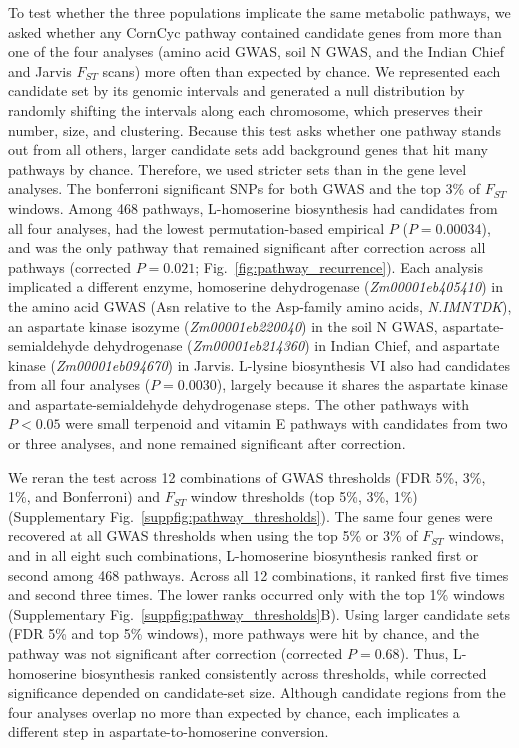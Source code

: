 To test whether the three populations implicate the same metabolic pathways, we asked whether any CornCyc pathway \citep{Hawkins2021PMN} contained candidate genes from more than one of the four analyses (amino acid GWAS, soil N GWAS, and the Indian Chief and Jarvis $F_{ST}$ scans) more often than expected by chance. We represented each candidate set by its genomic intervals and generated a null distribution by randomly shifting the intervals along each chromosome, which preserves their number, size, and clustering. Because this test asks whether one pathway stands out from all others, larger candidate sets add background genes that hit many pathways by chance. Therefore, we used stricter sets than in the gene level analyses. The bonferroni significant SNPs for both GWAS and the top 3\% of $F_{ST}$ windows. Among 468 pathways, L-homoserine biosynthesis had candidates from all four analyses, had the lowest permutation-based empirical $P$ ($P = 0.00034$), and was the only pathway that remained significant after correction across all pathways (corrected $P = 0.021$; Fig.~\ref{fig:pathway_recurrence}). Each analysis implicated a different enzyme, homoserine dehydrogenase (\textit{Zm00001eb405410}) in the amino acid GWAS (Asn relative to the Asp-family amino acids, \textit{N.IMNTDK}), an aspartate kinase isozyme (\textit{Zm00001eb220040}) in the soil N GWAS, aspartate-semialdehyde dehydrogenase (\textit{Zm00001eb214360}) in Indian Chief, and aspartate kinase (\textit{Zm00001eb094670}) in Jarvis. L-lysine biosynthesis VI also had candidates from all four analyses ($P = 0.0030$), largely because it shares the aspartate kinase and aspartate-semialdehyde dehydrogenase steps. The other pathways with $P < 0.05$ were small terpenoid and vitamin E pathways with candidates from two or three analyses, and none remained significant after correction.

We reran the test across 12 combinations of GWAS thresholds (FDR 5\%, 3\%, 1\%, and Bonferroni) and $F_{ST}$ window thresholds (top 5\%, 3\%, 1\%) (Supplementary Fig.~\ref{suppfig:pathway_thresholds}). The same four genes were recovered at all GWAS thresholds when using the top 5\% or 3\% of $F_{ST}$ windows, and in all eight such combinations, L-homoserine biosynthesis ranked first or second among 468 pathways. Across all 12 combinations, it ranked first five times and second three times. The lower ranks occurred only with the top 1\% windows (Supplementary Fig.~\ref{suppfig:pathway_thresholds}B). Using larger candidate sets (FDR 5\% and top 5\% windows), more pathways were hit by chance, and the pathway was not significant after correction (corrected $P=0.68$). Thus, L-homoserine biosynthesis ranked consistently across thresholds, while corrected significance depended on candidate-set size. Although candidate regions from the four analyses overlap no more than expected by chance, each implicates a different step in aspartate-to-homoserine conversion.

